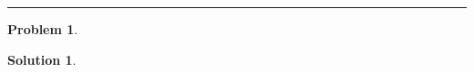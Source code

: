\documentclass[a4paper, 10pt]{article}
\theoremstyle{definition}
\newtheorem{problem}{Problem}
\theoremstyle{hSol}
\newtheorem*{solution}{Solution}
\begin{document}
\noindent\rule{16cm}{0.4pt}
\begin{problem} 
\end{problem}
\begin{solution} 
\end{solution}
\end{document}
